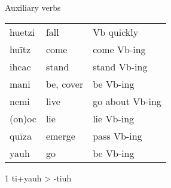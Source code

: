 \documentclass[12pt]{beamer}
\newcommand{\nah}[1]{\textcolor{nahgrn}{#1}}
\newcommand{\trs}[1]{\textcolor{nahblu}{#1}}
\begin{document}
\begin{frame}
\begin{columns}[t]
\begin{column}{.18\linewidth}
\begin{block}{Auxiliary verbs}
\begin{threeparttable}
\begin{tabular}{lll}
            \nah{huetzi}             & \trs{fall}                  & \trs{Vb   quickly}       \\
            \nah{huītz}              & \trs{come}                  & \trs{come   Vb-ing}      \\
            \nah{ihcac}              & \trs{stand}                 & \trs{stand   Vb-ing}     \\
            \nah{mani}               & \trs{be, cover}             & \trs{be Vb-ing}          \\
            \nah{nemi}               & \trs{live}                  & \trs{go   about Vb-ing}  \\
            \nah{(on)oc}             & \trs{lie}                   & \trs{lie   Vb-ing}       \\
            \nah{quīza}              & \trs{emerge}                & \trs{pass   Vb-ing}      \\
            \nah{yauh}\tnote{1}      & \trs{go}                    & \trs{be Vb-ing}          \\
          \end{tabular}
          \begin{tablenotes}
            \item[1] \nah{ti+yauh} > \nah{-tiuh}
          \end{tablenotes}
        \end{threeparttable}


\end{block}
\end{column}
\end{columns}
\end{frame}
\end{document}
